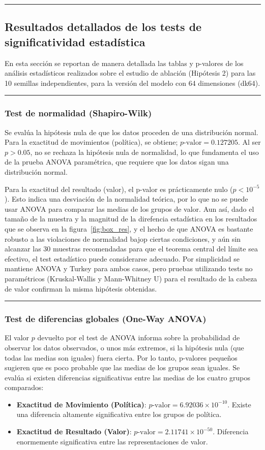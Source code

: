 \documentclass[12pt, a4paper]{article}
\begin{document}
\rule{\textwidth}{0.2pt}
\subsection{Resultados detallados de los tests de significatividad estadística}\label{sec:anexos_significancia}

En esta sección se reportan de manera detallada las tablas y p-valores de los análisis estadísticos realizados sobre el estudio de ablación (Hipótesis 2) para las 10 semillas independientes, para la versión del modelo con 64 dimensiones (dk64).

\rule{\textwidth}{0.2pt}
\subsubsection{Test de normalidad (Shapiro-Wilk)}
Se evalúa la hipótesis nula de que los datos proceden de una distribución normal. Para la exactitud de movimientos (política), se obtiene; $p\text{-valor} = 0.127205$. Al ser $p > 0.05$, no se rechaza la hipótesis nula de normalidad, lo que fundamenta el uso de la prueba ANOVA paramétrica, que requiere que los datos sigan una distribución normal.

Para la exactitud del resultado (valor), el p-valor es prácticamente nulo ($p < 10^{-5}$). Esto indica una desviación de la normalidad teórica, por lo que no se puede usar ANOVA para comparar las medias de los grupos de valor. Aun así, dado el tamaño de la muestra y la magnitud de la direfencia estadística en los resultados que se observa en la figura~\ref{fig:box_res}, y el hecho de que ANOVA es bastante robusto a las violaciones de normalidad bajop ciertas condiciones, y aún sin alcanzar las 30 muestras recomendadas para que el teorema central del límite sea efectivo, el test estadístico puede considerarse adecuado. Por simplicidad se mantiene ANOVA y Turkey para ambos casos, pero pruebas utilizando tests no paramétricos (Kruskal-Wallis y  Mann-Whitney U) para el resultado de la cabeza de valor confirman la misma hipótesis obtenidas. 

\rule{\textwidth}{0.2pt}
\subsubsection{Test de diferencias globales (One-Way ANOVA)}
El valor $p$ devuelto por el test de ANOVA informa sobre la probabilidad de observar los datos observados, o unos más extremos, si la hipótesis nula (que todas las medias son iguales) fuera cierta. Por lo tanto, p-valores pequeños sugieren que es poco probable que las medias de los grupos sean iguales. Se evalúa si existen diferencias significativas entre las medias de los cuatro grupos comparados:
\begin{itemize}
    \item \textbf{Exactitud de Movimiento (Política)}: $p\text{-valor} = 6.92036 \times 10^{-10}$. Existe una diferencia altamente significativa entre los grupos de política.
    \item \textbf{Exactitud de Resultado (Valor)}: $p\text{-valor} = 2.11741 \times 10^{-50}$. Diferencia enormemente significativa entre las representaciones de valor.
\end{itemize}
\end{document}
